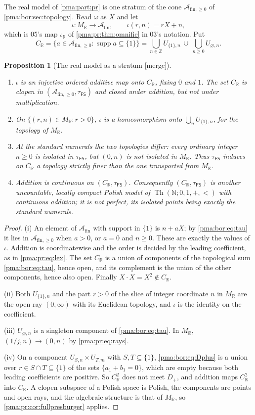 \documentclass[11pt]{article}
\numberwithin{equation}{section}
\newtheorem{proposition}[proposition]{Proposition}
\theoremstyle{definition}
\theoremstyle{remark}
\newcommand{\N}{\mathbb N}
\newcommand{\Z}{\mathbb Z}
\newcommand{\R}{\mathbb R}
\newcommand{\MR}{M_{\R}}
\newcommand{\Th}{\operatorname{Th}}
\newcommand{\supp}{\operatorname{supp}}
\newcommand{\FS}{\mathsf{FS}}
\newcommand{\A}{\mathcal A_{\mathrm{fin}}}
\newcommand{\PP}{\mathcal A_{\mathrm{fin},\geq 0}}
\newcommand{\mergetag}{\textup{\textsf{\small[merge]}}}
\begin{document}
The real model of \cref{pma:part:pr} is one stratum of the cone $\PP$ of
\cref{pma:bor:sec:topology}. Read $\omega$ as $X$ and let
\[
 \iota:\MR\longrightarrow\A,\qquad \iota(r,n)=rX+n,
\]
which is 05's map $\iota_{\R}$ of \cref{pma:pr:thm:omnific} in 03's notation.
Put
\[
 C_{\R}=\{a\in\PP:\supp a\subseteq\{1\}\}
 =\bigcup_{n\in\Z}U_{\{1\},n}\ \cup\ \bigcup_{n\ge0}U_{\varnothing,n}.
\]

\begin{proposition}[The real model as a stratum \mergetag]\label{pma:prop:stratum}
\begin{enumerate}[label=\textup{(\roman*)}]
\item $\iota$ is an injective ordered additive map onto $C_{\R}$, fixing $0$
and $1$. The set $C_{\R}$ is clopen in $(\PP,\tau_{\FS})$ and closed under
addition, but not under multiplication.
\item On $\{(r,n)\in\MR:r>0\}$, $\iota$ is a homeomorphism onto
$\bigcup_nU_{\{1\},n}$, for the topology of $\MR$.
\item At the standard numerals the two topologies differ: every ordinary
integer $n\ge0$ is isolated in $\tau_{\FS}$, but $(0,n)$ is not isolated in
$\MR$. Thus $\tau_{\FS}$ induces on $C_{\R}$ a topology strictly finer than
the one transported from $\MR$.
\item Addition is continuous on $(C_{\R},\tau_{\FS})$. Consequently
$(C_{\R},\tau_{\FS})$ is another uncountable, locally compact Polish model of
$\Th(\N;0,1,+,<)$ with continuous addition; it is not perfect, its isolated
points being exactly the standard numerals.
\end{enumerate}
\end{proposition}
\begin{proof}
(i) An element of $\A$ with support in $\{1\}$ is $n+aX$; by
\eqref{pma:bor:eq:tau} it lies in $\PP$ when $a>0$, or $a=0$ and $n\ge0$. These
are exactly the values of $\iota$. Addition is coordinatewise and the order is
decided by the leading coefficient, as in \eqref{pma:pr:eq:lex}. The set
$C_{\R}$ is a union of components of the topological sum
\eqref{pma:bor:eq:tau}, hence open, and its complement is the union of the
other components, hence also open. Finally $X\cdot X=X^2\notin C_{\R}$.

(ii) Both $U_{\{1\},n}$ and the part $r>0$ of the slice of integer coordinate
$n$ in $\MR$ are the open ray $(0,\infty)$ with its Euclidean topology, and
$\iota$ is the identity on the coefficient.

(iii) $U_{\varnothing,n}$ is a singleton component of \eqref{pma:bor:eq:tau}.
In $\MR$, $(1/j,n)\to(0,n)$ by \eqref{pma:pr:eq:rays}.

(iv) On a component $U_{S,n}\times U_{T,m}$ with $S,T\subseteq\{1\}$,
\eqref{pma:bor:eq:Dplus} is a union over $r\in S\cap T\subseteq\{1\}$ of the
sets $\{a_1+b_1=0\}$, which are empty because both leading coefficients are
positive. So $C_{\R}^2$ does not meet $D_+$, and addition maps $C_{\R}^2$ into
$C_{\R}$. A clopen subspace of a Polish space is Polish, the components are
points and open rays, and the algebraic structure is that of $\MR$, so
\cref{pma:pr:cor:fullpresburger} applies.
\end{proof}
\end{document}

